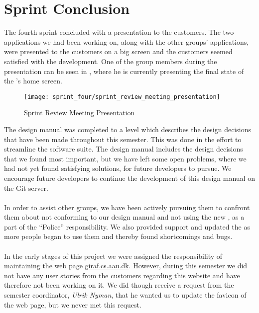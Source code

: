 
\chapter{Sprint Conclusion}
\label{cha:conclusion_sprint_4}

The fourth sprint concluded with a presentation to the customers. The two applications we had been working on, along with the other groups' applications, were presented to the customers on a big screen and the customers seemed satisfied with the development. One of the group members during the presentation can be seen in , where he is currently presenting the final state of the \launcher 's home screen.

\begin{figure}[!htbp]
    \centering
    \texttt{[image: sprint\_four/sprint\_review\_meeting\_presentation]}
    \caption{Sprint Review Meeting Presentation}
    \label{fig:sprint_review_meeting_presentation}
\end{figure}

\FloatBarrier

The design manual was completed to a level which describes the design decisions that have been made throughout this semester. This was done in the effort to streamline the \giraf software suite. The design manual includes the design decisions that we found most important, but we have left some open problems, where we had not yet found satisfying solutions, for future \giraf developers to pursue. We encourage future \giraf developers to continue the development of this design manual on the \giraf Git server.
\\\\
In order to assist other groups, we have been actively pursuing them to confront them about not conforming to our design manual and not using the new \gc, as a part of the ``\giraf Police'' responsibility. We also provided support and updated the \gc as more people began to use them and thereby found shortcomings and bugs. 
\\\\
 In the early stages of this project we were assigned the responsibility of maintaining the web page \url{giraf.cs.aau.dk}. However, during this semester we did not have any user stories from the customers regarding this website and have therefore not been working on it.  We did though receive a request from the semester coordinator, \emph{Ulrik Nyman}, that he wanted us to update the favicon of the web page, but we never met this request. 